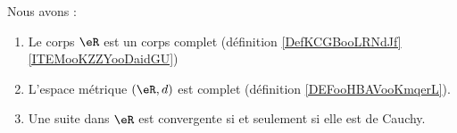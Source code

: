 \begin{theorem} \label{ThoTFGioqS} \label{ThoHGyzAva}
    Nous avons :
    \begin{enumerate}
        \item
            Le corps \( \eR\) est un corps complet (définition \ref{DefKCGBooLRNdJf}\ref{ITEMooKZZYooDaidGU})
        \item
            L'espace métrique \( (\eR,d)\) est complet (définition \ref{DEFooHBAVooKmqerL}).
        \item
            Une suite dans \( \eR\) est convergente si et seulement si elle est de Cauchy.
    \end{enumerate}
\end{theorem}


